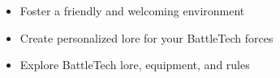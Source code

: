 \begin{itemize}

  \item Foster a friendly and welcoming environment

  \item Create personalized lore for your BattleTech forces

  \item Explore BattleTech lore, equipment, and rules

\end{itemize}
